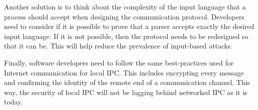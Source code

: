 Another solution is to think about the complexity of the input language that a process should accept when designing the communication protocol.  Developers need to consider if it is possible to prove that a parser accepts exactly the desired input language.  If it is not possible, then the protocol needs to be redesigned so that it can be.  This will help reduce the prevalence of input-based attacks.

Finally, software developers need to follow the same best-practices used for Internet communication for local IPC.  This includes encrypting every message and confirming the identity of the remote end of a communication channel.  This way, the security of local IPC will not be lagging behind networked IPC as it is today.
